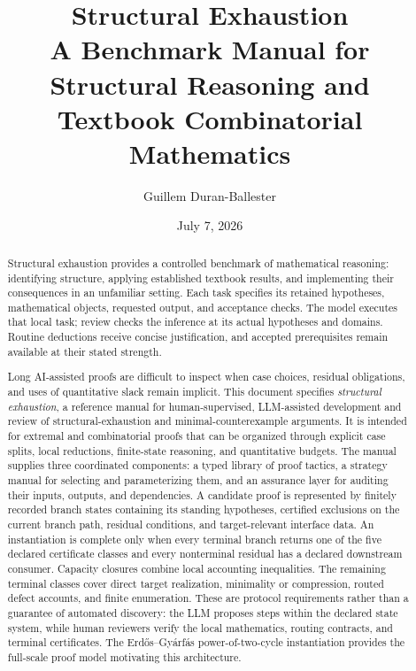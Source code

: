 \documentclass[
  11pt,
]{article}
\title{Structural Exhaustion\\[0.4em]
\large A Benchmark Manual for Structural Reasoning
and Textbook Combinatorial Mathematics}
\author{Guillem Duran-Ballester}
\date{July 7, 2026}
\theoremstyle{definition}
\begin{document}
\maketitle

\begin{abstract}
Structural exhaustion provides a controlled benchmark of mathematical
reasoning: identifying structure, applying established textbook results, and
implementing their consequences in an unfamiliar setting. Each task specifies
its retained hypotheses, mathematical objects, requested output, and acceptance
checks. The model executes that local task; review checks the inference at its
actual hypotheses and domains. Routine deductions receive concise justification,
and accepted prerequisites remain available at their stated strength.

Long AI-assisted proofs are difficult to inspect when case choices, residual
obligations, and uses of quantitative slack remain implicit. This document
specifies \emph{structural exhaustion}, a reference manual for human-supervised,
LLM-assisted development and review of structural-exhaustion and
minimal-counterexample arguments. It is intended for extremal and
combinatorial proofs that can be organized through explicit case splits, local
reductions, finite-state reasoning, and quantitative budgets. The manual
supplies three coordinated components: a typed library of proof tactics, a
strategy manual for selecting and parameterizing them, and an assurance layer
for auditing their inputs, outputs, and dependencies. A candidate proof is
represented by finitely recorded branch states containing its standing
hypotheses, certified exclusions on the current branch path, residual
conditions, and target-relevant interface data. An instantiation is complete only when every terminal branch
returns one of the five declared certificate classes and every nonterminal
residual has a declared downstream consumer. Capacity closures combine local
accounting inequalities. The remaining terminal classes cover direct target
realization, minimality or compression, routed defect accounts, and finite
enumeration.
These are protocol requirements rather than a guarantee of automated
discovery: the LLM proposes steps within the declared state system, while human
reviewers verify the local mathematics, routing contracts, and terminal
certificates. The Erdős--Gyárfás
power-of-two-cycle instantiation provides the full-scale proof model
motivating this architecture.
\end{abstract}
\end{document}

